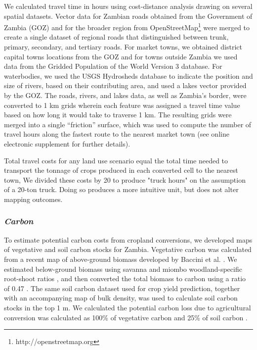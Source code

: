 \documentclass[a4paper]{article}
\begin{document}
{We calculated travel time in hours using cost-distance analysis drawing on several spatial datasets. Vector data for Zambian roads obtained from the Government of Zambia (GOZ) and for the broader region from OpenStreetMap\footnote{http://openstreetmap.org} were merged to create a single dataset of regional roads that distinguished between trunk, primary, secondary, and tertiary roads. For market towns, we obtained district capital towns locations from the GOZ and for towns outside Zambia we used data from the Gridded Population of the World Version 3 \citep{ciesin_gridded_2005} database. For waterbodies, we used the USGS Hydrosheds database \citep{lehner_new_2008} to indicate the position and size of rivers, based on their contributing area, and used a lakes vector provided by the GOZ. The roads, rivers, and lakes data, as well as Zambia's border, were converted to 1 km grids wherein each feature was assigned a travel time value based on how long it would take to traverse 1 km. The resulting grids were merged into a single ``friction'' surface, which was used to compute the number of travel hours along the fastest route to the nearest market town (see online electronic supplement for further details).  

Total travel costs for any land use scenario equal the total time needed to transport the tonnage of crops produced in each converted cell to the nearest town, We divided these costs by 20 to produce "truck hours" on the assumption of a 20-ton truck. Doing so produces a more intuitive unit, but does not alter mapping outcomes.

\subsubsection*{\emph{Carbon}} 

To estimate potential carbon costs from cropland conversions, we developed maps of vegetative and soil carbon stocks for Zambia.  Vegetative carbon was calculated from a recent map of above-ground biomass developed by Baccini et al. \citep{baccini_estimated_2012}. We estimated below-ground biomass using savanna and miombo woodland-specific root-shoot ratios \cite{mokany_critical_2006, mugasha_allometric_2013}, and then converted the total biomass to carbon using a ratio of 0.47 \citep{ipcc_land_1996}. The same soil carbon dataset used for crop yield prediction, together with an accompanying map of bulk density, was used to calculate soil carbon stocks in the top 1 m. We calculated the potential carbon loss due to agricultural conversion was calculated as 100\% of vegetative carbon and 25\% of soil carbon \cite{searchinger_high_2015}. 
 
}
\end{document}
